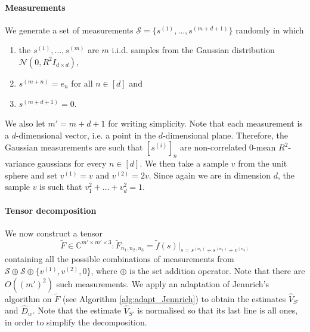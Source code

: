 \paragraph{Measurements} We generate a set of measurements $\mathcal{S}=\{s^{(1)},\ldots,s^{(m+d+1)}\}$ randomly in which
\begin{enumerate}
    \item the $s^{(1)},\ldots,s^{(m)}$ are $m$ i.i.d. samples from the Gaussian distribution $\mathcal{N}(0,R^2I_{d\times d})$,
    \item $s^{(m+n)}=e_n$ for all $n\in[d]$ and
    \item $s^{(m+d+1)}=0$.
\end{enumerate}
We also let $m'=m+d+1$ for writing simplicity. Note that each measurement is a $d$-dimensional vector, i.e. a point in the $d$-dimensional plane. Therefore, the Gaussian measurements are such that $[s^{(i)}]_n$ are non-correlated 0-mean $R^2$-variance gaussians for every $n\in[d]$. We then take a sample $v$ from the unit sphere and set $v^{(1)}=v$ and $v^{(2)}=2v$. Since again we are in dimension $d$, the sample $v$ is such that $v_1^2+\ldots+v_d^2=1$.
\paragraph{Tensor decomposition} We now construct a tensor $$\widetilde{F}\in\mathbb{C}^{m'\times m'\times 3}:\widetilde{F}_{n_1,n_2,n_3}=\widetilde{f}(s)|_{s=s^{(n_1)}+s^{(n_2)}+v^{(n_3)}}$$ containing all the possible combinations of measurements from $\mathcal{S}\oplus\mathcal{S}\oplus\{v^{(1)},v^{(2)},0\}$, where $\oplus$ is the set addition operator. Note that there are $O((m')^2)$ such measurements. We apply an adaptation of Jennrich's algorithm on $\widetilde{F}$ (see Algorithm \ref{alg:adapt_Jennrich}) to obtain the estimates $\widehat{V}_{S'}$ and $\widehat{D}_w$. Note that the estimate $\widehat{V}_{S'}$ is normalised so that its last line is all ones, in order to simplify the decomposition.
